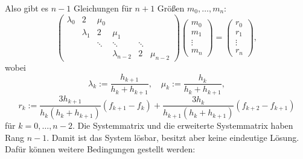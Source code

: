 Also gibt es $n-1$ Gleichungen für $n+1$ Größen $m_0, \ldots, m_n$:
\[ \begin{pmatrix} 
    \lambda_0 & 2         & \mu_0  &               &        & \\
              & \lambda_1 & 2      & \mu_1         &        & \\
              &           & \ddots & \ddots        & \ddots & \\
              &           &        & \lambda_{n-2} & 2      & \mu_{n-2}
   \end{pmatrix}
   \begin{pmatrix}
    m_0 \\ m_1 \\ \vdots \\ m_n
   \end{pmatrix}
   =
   \begin{pmatrix}
    r_0 \\ r_1 \\ \vdots \\ r_n
   \end{pmatrix}, \]
wobei
\[ \lambda_k := \frac{h_{k+1}}{h_k + h_{k+1}}, \quad \mu_k := \frac{h_k}{h_k + h_{k+1}}, \]
\[ r_k := \frac{3h_{k+1}}{h_k(h_k + h_{k+1})} (f_{k+1} - f_k) + \frac{3 h_k}{h_{k+1}(h_k + h_{k+1})} ( f_{k+2} - f_{k+1} ) \]
für $k = 0, \ldots, n-2$. Die Systemmatrix und die erweiterte Systemmatrix haben Rang $n-1$. Damit ist das System lösbar, besitzt aber keine eindeutige Lösung. Dafür können weitere Bedingungen gestellt werden:
